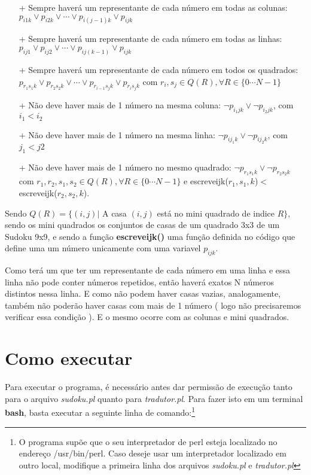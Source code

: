 \documentclass[11pt]{article}
\begin{document}
\begin{itemize}

 \item[+] Sempre haverá um representante de cada número em todas as colunas: $p_{i1k}\vee p_{i2k}\vee \cdots \vee p_{i(j-1)k}\vee p_{ijk}$
 \item[+] Sempre haverá um representante de cada número em todas as linhas:
 $p_{ij1}\vee p_{ij2}\vee \cdots \vee p_{ij(k-1)}\vee p_{ijk}$
 \item[+] Sempre haverá um representante de cada número em todos os quadrados:
 $p_{r_{1}s_{1}k}\vee p_{r_{2}s_{2}k}\vee \cdots \vee p_{r_{i-1}s_{j}k}\vee p_{r_{i}s_{j}k}$ com $r_{i}, s_{j} \in Q(R), \forall R \in \{0\cdots N-1\} $
 \item[+] Não deve haver mais de 1 número na mesma coluna:
 $\neg p_{i_{1}jk}\vee \neg p_{i_{2}jk}$, com $i_{1}<i_{2} $
 \item[+] Não deve haver mais de 1 número na mesma linha:
 $\neg p_{ij_{1}k}\vee \neg p_{ij_{2}k}  $, com $j_{1}<j{2} $
 \item[+] Não deve haver mais de 1 número no mesmo quadrado:
 $\neg p_{r_{1}s_{1}k}\vee \neg p_{r_{2}s_{2}k} $ com $r_{1},r_{2}, s_{1}, s_{2} \in Q(R), \forall R \in \{0\cdots N-1\}$ e escreveijk($r_{1},s_{1},k$)$<$ escreveijk($ r_{2},s_{2},k $).
 
 
\end{itemize}

Sendo $Q(R) = \{ (i,j) |$ A casa $(i,j)$ está no mini quadrado de indice $R \}$, sendo os mini quadrados os conjuntos de casas de um quadrado 3x3 de um Sudoku 9x9, e sendo a função \textbf{\color{red}escreveijk()} uma função definida no código que define uma um número unicamente com uma variavel $p_{ijk}$.



Como terá um que ter um representante de cada número em uma linha e essa
 linha não pode conter números repetidos, então haverá exatos N números
 distintos nessa linha. E como não podem haver casas vazias, analogamente,
 também não poderão haver casas com mais de 1 número ( logo não precisaremos
 verificar essa condição ). E o mesmo ocorre com as colunas e mini quadrados.

\section{Como executar}

Para executar o programa, é necessário antes dar permissão de execução tanto para o arquivo \emph{sudoku.pl} quanto para \emph{tradutor.pl}. Para fazer isto em um terminal \textbf{\color{red}bash}, basta executar a seguinte linha de comando:\footnote{O programa supõe que o seu interpretador de perl esteja localizado no endereço {\color{red}/usr/bin/perl}. Caso deseje usar um interpretador localizado em outro local, modifique a primeira linha dos arquivos \emph{sudoku.pl} e \emph{tradutor.pl}}
\end{document}
